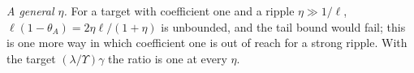 \emph{A general $\eta$.}
For a target with coefficient one and a ripple $\eta\gg1/\ell$, $\ell(1-\theta_A)=2\eta\ell/(1+\eta)$ is unbounded, and the tail bound would fail; this is one more way in which coefficient one is out of reach for a strong ripple.
With the target $(\lambda/\Upsilon)\gamma$ the ratio is one at every $\eta$.

